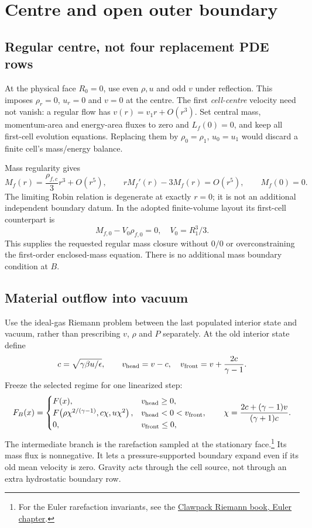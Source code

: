 \documentclass[11pt]{article}
\begin{document}
\section{Centre and open outer boundary}
\subsection{Regular centre, not four replacement PDE rows}
At the physical face $R_0=0$, use even $\rho,u$ and odd $v$ under
reflection. This imposes $\rho_r=0$, $u_r=0$ and $v=0$ at the centre.
The first \emph{cell-centre} velocity need not vanish: a regular flow
has $v(r)=v_1r+O(r^3)$. Set central mass, momentum-area and energy-area
fluxes to zero and $L_f(0)=0$, and keep all first-cell evolution equations.
Replacing them by $\rho_0=\rho_1$, $u_0=u_1$ would discard a finite
cell's mass/energy balance.

Mass regularity gives
\begin{equation}
 M_f(r)=\frac{\rho_{f,c}}3r^3+O(r^5),\qquad
 rM_f'(r)-3M_f(r)=O(r^5),\qquad M_f(0)=0.
 \label{eq:robin}
\end{equation}
The limiting Robin relation is degenerate at exactly $r=0$; it is not
an additional independent boundary datum. In the adopted finite-volume
layout its first-cell counterpart is
\begin{equation}
 \boxed{M_{f,0}-V_0\rho_{f,0}=0,\quad V_0=R_1^3/3.}
\end{equation}
This supplies the requested regular mass closure without $0/0$ or
overconstraining the first-order enclosed-mass equation. There is no
additional mass boundary condition at $B$.

\subsection{Material outflow into vacuum}\label{sec:outer}
Use the ideal-gas Riemann problem between the last populated interior
state and vacuum, rather than prescribing $v$, $\rho$ and $P$ separately.
At the old interior state define
\begin{equation}
 c=\sqrt{\gamma\beta u/\epsilon},\qquad
 v_{\rm head}=v-c,\quad v_{\rm front}=v+\frac{2c}{\gamma-1}.
\end{equation}
Freeze the selected regime for one linearized step:
\begin{equation}
 F_B(x)=\begin{cases}
 F(x),&v_{\rm head}\ge0,\\
 F\!\left(\rho\chi^{2/(\gamma-1)},c\chi,u\chi^2\right),
 &v_{\rm head}<0<v_{\rm front},\\
 0,&v_{\rm front}\le0,
 \end{cases}\qquad
 \chi=\frac{2c+(\gamma-1)v}{(\gamma+1)c}.
 \label{eq:vacuum}
\end{equation}
The intermediate branch is the rarefaction sampled at the stationary
face.\footnote{For the Euler rarefaction invariants, see the
\href{https://www.clawpack.org/riemann_book/html/Euler.html}{Clawpack Riemann book, Euler chapter}.}
Its mass flux is nonnegative. It lets a pressure-supported boundary
expand even if its old mean velocity is zero. Gravity acts through the
cell source, not through an extra hydrostatic boundary row.
\end{document}
